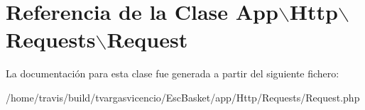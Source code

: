 \hypertarget{class_app_1_1_http_1_1_requests_1_1_request}{\section{\-Referencia de la \-Clase \-App$\backslash$\-Http$\backslash$\-Requests$\backslash$\-Request}
\label{class_app_1_1_http_1_1_requests_1_1_request}
}


\-La documentación para esta clase fue generada a partir del siguiente fichero\-:\begin{DoxyCompactItemize}
\item 
/home/travis/build/tvargasvicencio/\-Esc\-Basket/app/\-Http/\-Requests/\-Request.\-php\end{DoxyCompactItemize}
